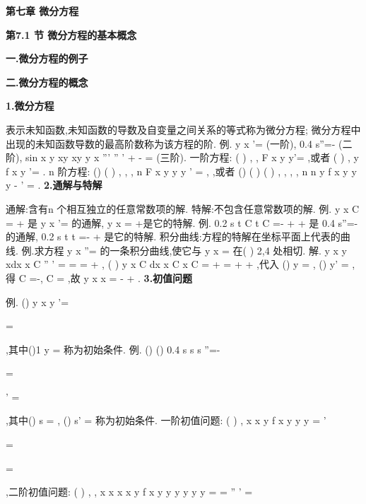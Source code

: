 \begin{center}
{\Large \bfseries \textcolor{lyred}{第七章 微分方程}}
\end{center}

\vspace{6pt}
{\large \bfseries \textcolor{lyred}{第7.1 节 微分方程的基本概念}}

\vspace{4pt}
{\bfseries \textcolor{lyred}{一.微分方程的例子}}

\vspace{4pt}
{\bfseries \textcolor{lyred}{二.微分方程的概念}}

{\bfseries \textcolor{lyred}{1.微分方程}}

表示未知函数,未知函数的导数及自变量之间关系的等式称为\textcolor{lyred}{微分方程}; 
微分方程中出现的未知函数导数的最高阶数称为该方程的\textcolor{lyred}{阶}. 
\textcolor{lyred}{例}.
y
x
'=
(一阶),
0.4
s''=-
(二阶),
sin
x y
xy
xy
y
x
'''
''
'
+
-
=
(三阶). 
\textcolor{lyred}{一阶方程}:
(
)
, ,
F x y y'=
,或者
(
)
,
y
f x y
'=
. 
\textcolor{lyred}{n 阶方程}:
()
(
)
, ,
,
n
F x y y
y
'
=
\Lambda ,
,或者
()
(
)
(
)
, ,
,
,
n
n
y
f x y y
y
-
'
=
\Lambda 
. 
{\bfseries \textcolor{lyred}{2.通解与特解}}

\textcolor{lyred}{通解}:含有n 个相互独立的任意常数项的解. 
\textcolor{lyred}{特解}:不包含任意常数项的解. 
\textcolor{lyred}{例}.
y
x
C
=
+
是
y
x
'=
的通解,
y
x
=
+是它的特解. 
\textcolor{lyred}{例}.
0.2
s
t
C t
C
=-
+
+
是
0.4
s''=-
的通解,
0.2
s
t
t
=-
+
是它的特解. 
\textcolor{lyred}{积分曲线}:方程的特解在坐标平面上代表的曲线. 
\textcolor{lyred}{例}.求方程
y
x
''=
的一条积分曲线,使它与
y
x
=
在(
)
2,4 处相切. 
解.
y
x
y
xdx
x
C
''
'
=
\Rightarrow 
=
=
+
\int 
,
(
)
y
x
C
dx
x
C x
C
=
+
=
+
+
\int 
,代入 
()
y
=
,
()
y'
=
,得
C =-,
C =
,故
y
x
x
=
-
+
. 
{\bfseries \textcolor{lyred}{3.初值问题}}

\textcolor{lyred}{例}.
()
y
x
y
'=


=

,其中()1
y
=
称为\textcolor{lyred}{初始条件}. 
\textcolor{lyred}{例}.
()
()
0.4
s
s
s
''=-


=

'
=

,其中()
s
=
, ()
s'
=
称为\textcolor{lyred}{初始条件}. 
\textcolor{lyred}{一阶初值问题}:
(
)
,
x x
y
f x y
y
y
=
'

=

=

,\textcolor{lyred}{二阶初值问题}:
(
)
, ,
x x
x x
y
f x y y
y
y
y
y
=
=
''
'
=

